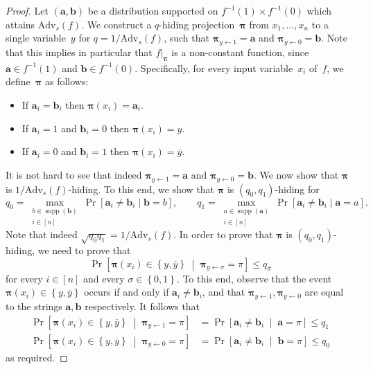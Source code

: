 \documentclass[11pt]{article}
\numberwithin{equation}{section}
\theoremstyle{definition}
\theoremstyle{plain}
\theoremstyle{definition}\newtheorem{notation}[theorem]{Notation}\theoremstyle{plain}
\newcommand{\B}{\left\{ 0,1 \right \}}
\newcommand{\p}{\boldsymbol{\pi}}
\renewcommand{\a}{\boldsymbol{a}}
\renewcommand{\b}{\boldsymbol{b}}
\newcommand{\Am}{\mathrm{Adv}_{s}}
\DeclareMathOperator{\supp}{supp}
\theoremstyle{definition}
\theoremstyle{plain}
\begin{document}
\begin{proof}
Let $(\a,\b)$ be a distribution supported on $f^{-1}(1)\times f^{-1}(0)$
which attains $\Am(f)$. We construct a $q$-hiding projection~$\p$
from $x_{1},\ldots,x_{n}$ to a single variable~$y$ for $q=1/\Am(f)$,
such that $\p_{y\gets1}=\a$ and $\p_{y\gets0}=\b$. Note that this
implies in particular that $f|_{\p}$ is a non-constant function,
since $\a\in f^{-1}(1)$ and $\b\in f^{-1}(0)$. Specifically, for
every input variable~$x_{i}$ of~$f$, we define~$\p$ as follows: 
\begin{itemize}
\item If $\a_{i}=\b_{i}$ then $\p(x_{i})=\a_{i}$. 
\item If $\a_{i}=1$ and $\b_{i}=0$ then $\p(x_{i})=y$. 
\item If $\a_{i}=0$ and $\b_{i}=1$ then $\p(x_{i})=\overline{y}$. 
\end{itemize}
It is not hard to see that indeed $\p_{y\gets1}=\a$ and $\p_{y\gets0}=\b$.
We now show that $\p$ is $1/\Am(f)$-hiding. To this end, we show
that $\p$ is $(q_{0},q_{1})$-hiding for 
\[
q_{0}=\max_{\substack{b\in\supp(\b)\\
i\in[n]
}
}\Pr[\a_{i}\neq\b_{i}\mid\b=b],\qquad q_{1}=\max_{\substack{a\in\supp(\a)\\
i\in[n]
}
}\Pr[\a_{i}\neq\b_{i}\mid\a=a].
\]
Note that indeed $\sqrt{q_{0}q_{1}}=1/\Am(f)$. In order to prove
that $\p$ is $(q_{0},q_{1})$-hiding, we need to prove that 
\[
\Pr\!\left[\p(x_{i})\in\left\{ y,\overline{y}\right\} \;\middle|\;\p_{y\gets\sigma}=\pi\right]\le q_{\sigma}
\]
for every $i\in\left[n\right]$ and every $\sigma\in\B$. To this
end, observe that the event $\p(x_{i})\in\left\{ y,\overline{y}\right\} $
occurs if and only if $\a_{i}\neq\b_{i}$, and that $\p_{y\gets1},\p_{y\gets0}$
are equal to the strings $\a,\b$ respectively. It follows that
\begin{align*}
\Pr\!\left[\p(x_{i})\in\left\{ y,\overline{y}\right\} \;\middle|\;\p_{y\gets1}=\pi\right] & =\Pr\!\left[\a_{i}\ne\b_{i}\;\middle|\;\a=\pi\right]\le q_{1}\\
\Pr\!\left[\p(x_{i})\in\left\{ y,\overline{y}\right\} \;\middle|\;\p_{y\gets0}=\pi\right] & =\Pr\!\left[\a_{i}\ne\b_{i}\;\middle|\;\b=\pi\right]\le q_{0}
\end{align*}
as required.
\end{proof}
\end{document}
